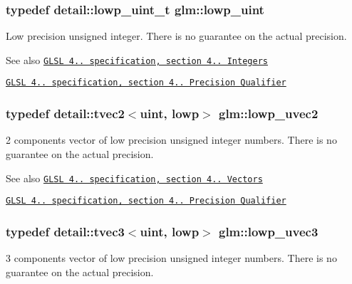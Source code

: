 \subsubsection[{\texorpdfstring{lowp\+\_\+uint}{lowp_uint}}]{\setlength{\rightskip}{0pt plus 5cm}typedef detail\+::lowp\+\_\+uint\+\_\+t {\bf glm\+::lowp\+\_\+uint}}\hypertarget{group__core__precision_ga8077c90f2c87e419ea6c273157dcc1fc}{}\label{group__core__precision_ga8077c90f2c87e419ea6c273157dcc1fc}
Low precision unsigned integer. There is no guarantee on the actual precision.

\begin{DoxySeeAlso}{See also}
\href{http://www.opengl.org/registry/doc/GLSLangSpec.4.20.8.pdf}{\tt G\+L\+SL 4.. specification, section 4.. Integers} 

\href{http://www.opengl.org/registry/doc/GLSLangSpec.4.20.8.pdf}{\tt G\+L\+SL 4.. specification, section 4.. Precision Qualifier} 
\end{DoxySeeAlso}
\subsubsection[{\texorpdfstring{lowp\+\_\+uvec2}{lowp_uvec2}}]{\setlength{\rightskip}{0pt plus 5cm}typedef detail\+::tvec2$<$uint, lowp$>$ {\bf glm\+::lowp\+\_\+uvec2}}\hypertarget{group__core__precision_ga06c64bb528bbecf276ab2d4a2b6c934e}{}\label{group__core__precision_ga06c64bb528bbecf276ab2d4a2b6c934e}
2 components vector of low precision unsigned integer numbers. There is no guarantee on the actual precision.

\begin{DoxySeeAlso}{See also}
\href{http://www.opengl.org/registry/doc/GLSLangSpec.4.20.8.pdf}{\tt G\+L\+SL 4.. specification, section 4.. Vectors} 

\href{http://www.opengl.org/registry/doc/GLSLangSpec.4.20.8.pdf}{\tt G\+L\+SL 4.. specification, section 4.. Precision Qualifier} 
\end{DoxySeeAlso}
\subsubsection[{\texorpdfstring{lowp\+\_\+uvec3}{lowp_uvec3}}]{\setlength{\rightskip}{0pt plus 5cm}typedef detail\+::tvec3$<$uint, lowp$>$ {\bf glm\+::lowp\+\_\+uvec3}}\hypertarget{group__core__precision_ga26fd88e52fe7003d41b0c57c5edffd6e}{}\label{group__core__precision_ga26fd88e52fe7003d41b0c57c5edffd6e}
3 components vector of low precision unsigned integer numbers. There is no guarantee on the actual precision.

